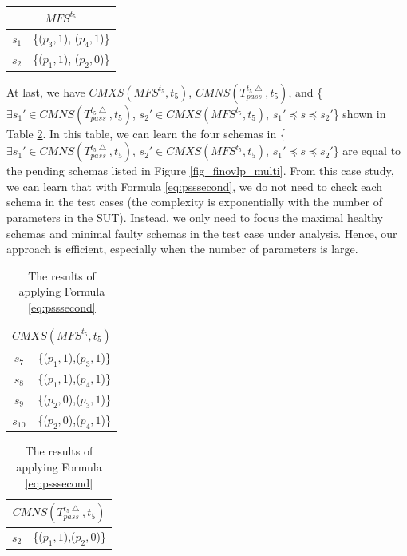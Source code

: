 {\begin{table}[htbp]
\begin{tabular}{|c|c|}
  \hline
   \end{tabular}
   \quad
  \begin{tabular}{|c|c|} \hline
     \multicolumn{2}{|c|}{$MFS^{t_{5}}$} \\ \hline
  $s_{1}$ & \{($p_{3}, 1$), ($p_{4}, 1$)\} \\
  $s_{2}$ & \{($p_{1}, 1$), ($p_{2}, 0$)\} \\ \hline
    \end{tabular}%
\end{table}


 At last, we have  $CMXS(MFS^{t_{5}}, t_{5})$,  $CMNS(T_{pass}^{t_{5}\bigtriangleup}, t_{5})$, and \{$\exists s_{1}' \in CMNS(T_{pass}^{t_{5}\bigtriangleup}, t_{5})$, $s_{2}' \in CMXS(MFS^{t_{5}}, t_{5})$, $s_{1}' \preceq s \preceq s_{2}'$\} shown in Table \ref{resultofcasestudy}.  In this table, we can learn the four schemas in   \{$\exists s_{1}' \in CMNS(T_{pass}^{t_{5}\bigtriangleup}, t_{5})$, $s_{2}' \in CMXS(MFS^{t_{5}}, t_{5})$, $s_{1}' \preceq s \preceq s_{2}'$\}  are equal to the pending schemas listed in Figure \ref{fig_finovlp_multi}. From this case study, we can learn that with Formula \ref{eq:psssecond}, we do not need to check each schema in the test cases (the complexity is exponentially with the number of parameters in the SUT). Instead, we only need to focus the maximal healthy schemas and minimal faulty schemas in the test case under analysis. Hence, our approach is efficient, especially when the number of parameters is large.


 \begin{table}[htbp]
  \centering
  \caption{The results of applying Formula \ref{eq:psssecond}}
  \label{resultofcasestudy}
  \begin{tabular}{|c|c|} \hline
     \multicolumn{2}{|c|}{$CMXS(MFS^{t_{5}}, t_{5})$} \\ \hline
   $s_{7}$ & \{($p_{1}, 1$),($p_{3}, 1$)\} \\
   $s_{8}$ & \{($p_{1}, 1$),($p_{4}, 1$)\} \\
   $s_{9}$ & \{($p_{2}, 0$),($p_{3}, 1$)\} \\
   $s_{10}$ & \{($p_{2}, 0$),($p_{4}, 1$)\} \\
    \hline
    \end{tabular}%
  \quad
    \begin{tabular}{|c|c|} \hline
     \multicolumn{2}{|c|}{$CMNS(T_{pass}^{t_{5}\bigtriangleup}, t_{5})$} \\ \hline

   $s_{2}$ & \{($p_{1}, 1$),($p_{2}, 0$)\} \\


\end{tabular}
\end{table}}
